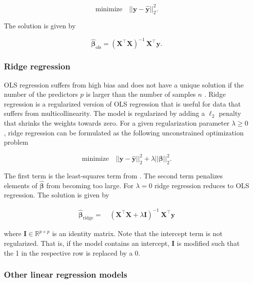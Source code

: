 \documentclass[utf8]{frontiersSCNS} %
\renewcommand{\b}{\boldsymbol{\beta}} %
\newcommand{\bh}{\boldsymbol{\hat{\beta}}} %
\newcommand{\bOLS}{\boldsymbol{\hat{\beta}}_\text{ols}}
\newcommand{\I}{\mathbf{I}}
\newcommand{\R}{\mathbb{R}}
\newcommand{\X}{\mathbf{X}}
\newcommand{\y}{\mathbf{y}}
\newcommand{\yh}{\mathbf{\hat{y}}}
\begin{document}
\begin{equation}\label{eq:ols_optimization_problem}
\text{minimize}\quad ||\y-\yh||_2^2.
\end{equation}

 The solution is given by 
 
 \begin{equation}\label{eq:ols_solution}
 \bOLS =(\X^\top\X)^{-1}\,\X^\top\y.
 \end{equation}

\subsubsection{Ridge regression}

OLS regression suffers from high bias and does not have a unique solution if the number of the predictors $p$ is larger than the number of samples $n$ \citep{Marquardt1975RidgePractice,vanWieringen2015LectureRegression}. Ridge regression is a regularized version of OLS regression that is useful for data that suffers from multicollinearity. The model is regularized by adding a $\ell_2$ penalty that shrinks the weights towards zero. For a given regularization parameter $\lambda\ge0$, ridge regression can be formulated as the following unconstrained optimization problem

\begin{equation*}
\text{minimize}\quad ||\y-\yh||_2^2 + \lambda ||\b||_2^2.
\end{equation*}

The first term is the least-squares term from . The second term penalizes elements of $\bh$ from becoming too large. For $\lambda=0$ ridge regression reduces to OLS regression. The solution is given by

\begin{align}
\label{eq:ridge_solution}
\bh_\text{ridge} =\ & (\X^\top\X + \lambda\I)^{-1}\ \X^\top\y 
\end{align}

where $\I\in\R^{p\times p}$ is an identity matrix.  Note that the intercept term is not regularized. That is, if the model contains an intercept, $\I$ is modified such that the 1 in the respective row is replaced by a 0.


\subsubsection{Other linear regression models}
\end{document}
